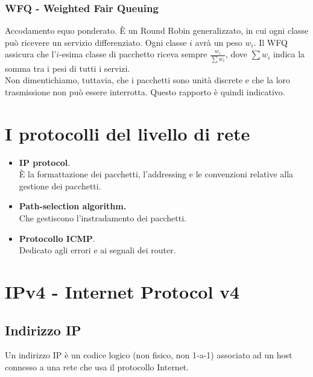 \subsubsection{WFQ - Weighted Fair Queuing}
Accodamento equo ponderato. È un Round Robin generalizzato, in cui ogni classe può ricevere un servizio differenziato. Ogni classe $i$ avrà un peso $w_i$. Il WFQ assicura che l'$i$-esima classe di pacchetto riceva sempre $\frac{w_i}{\sum{w_i}}$, dove $\sum w_i$ indica la somma tra i pesi di tutti i servizi.\\
Non dimentichiamo, tuttavia, che i pacchetti sono unità discrete e che la loro trasmissione non può essere interrotta. Questo rapporto è quindi indicativo.

\section{I protocolli del livello di rete}
\begin{itemize}
	\item \textbf{IP protocol}.\\
	È la formattazione dei pacchetti, l'addressing e le convenzioni relative alla gestione dei pacchetti.
	\item \textbf{Path-selection algorithm.}\\
	Che gestiscono l'instradamento dei pacchetti.
	\item \textbf{Protocollo ICMP}.\\
	Dedicato agli errori e ai segnali dei router.
\end{itemize}

\newpage

\section{IPv4 - Internet Protocol v4}

\subsection{Indirizzo IP}
Un indirizzo IP è un codice logico (non fisico, non 1-a-1) associato ad un host connesso a una rete che usa il protocollo Internet. 


